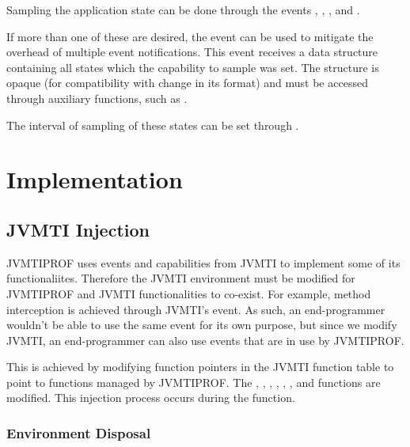Sampling the application state can be done through the events , , ,  and .

If more than one of these are desired, the  event can be used to mitigate the overhead of multiple event notifications. This event receives a data structure containing all states which the capability to sample was set. The structure is opaque (for compatibility with change in its format) and must be accessed through auxiliary functions, such as .

The interval of sampling of these states can be set through .

\section{Implementation} \label{sec:impl}

\subsection{JVMTI Injection}

JVMTIPROF uses events and capabilities from JVMTI to implement some of its functionaliites. Therefore the JVMTI environment must be modified for JVMTIPROF and JVMTI functionalities to co-exist. For example, method interception is achieved through JVMTI's  event. As such, an end-programmer wouldn't be able to use the same event for its own purpose, but since we modify JVMTI, an end-programmer can also use events that are in use by JVMTIPROF.

This is achieved by modifying function pointers in the JVMTI function table to point to functions managed by JVMTIPROF. The , , , , , ,  and  functions are modified. This injection process occurs during the  function.

\subsubsection*{Environment Disposal}

